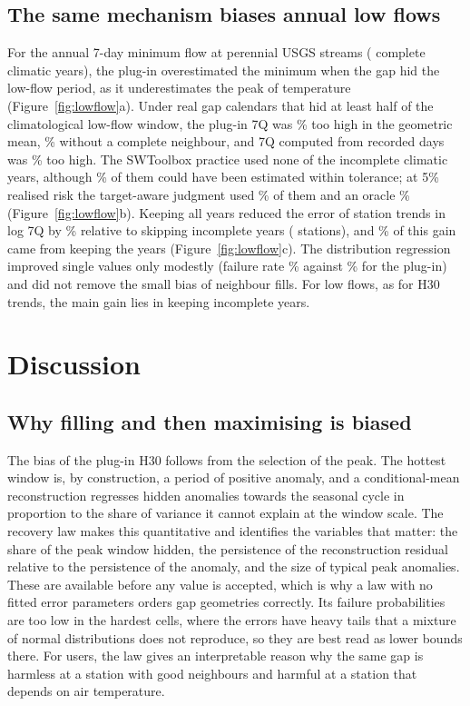 \documentclass[draft]{agujournal2025}
\begin{document}
\subsection{The same mechanism biases annual low flows}
For the annual 7-day minimum flow at \TFlowSites{} perennial USGS streams (\TFlowYears{} complete climatic years), the plug-in overestimated the minimum when the gap hid the low-flow period, as it underestimates the peak of temperature (Figure~\ref{fig:lowflow}a). Under real gap calendars that hid at least half of the climatological low-flow window, the plug-in 7Q was \TFlowBiasHalfPZero\% too high in the geometric mean, \TFlowBiasInterpPZero\% without a complete neighbour, and 7Q computed from recorded days was \TFlowBiasHalfRecorded\% too high. The SWToolbox practice used none of the incomplete climatic years, although \TFlowUsable\% of them could have been estimated within tolerance; at 5\% realised risk the target-aware judgment used \TFlowRetTarget\% of them and an oracle \TFlowRetOracle\% (Figure~\ref{fig:lowflow}b). Keeping all years reduced the error of station trends in log 7Q by \TFlowTrendReduction\% relative to skipping incomplete years (\TFlowTrendStations{} stations), and \TFlowShareKeep\% of this gain came from keeping the years (Figure~\ref{fig:lowflow}c). The distribution regression improved single values only modestly (failure rate \TFlowFailDTwo\% against \TFlowFailPZero\% for the plug-in) and did not remove the small bias of neighbour fills. For low flows, as for H30 trends, the main gain lies in keeping incomplete years.

\section{Discussion}

\subsection{Why filling and then maximising is biased}
The bias of the plug-in H30 follows from the selection of the peak. The hottest window is, by construction, a period of positive anomaly, and a conditional-mean reconstruction regresses hidden anomalies towards the seasonal cycle in proportion to the share of variance it cannot explain at the window scale. The recovery law makes this quantitative and identifies the variables that matter: the share of the peak window hidden, the persistence of the reconstruction residual relative to the persistence of the anomaly, and the size of typical peak anomalies. These are available before any value is accepted, which is why a law with no fitted error parameters orders gap geometries correctly. Its failure probabilities are too low in the hardest cells, where the errors have heavy tails that a mixture of normal distributions does not reproduce, so they are best read as lower bounds there. For users, the law gives an interpretable reason why the same gap is harmless at a station with good neighbours and harmful at a station that depends on air temperature.
\end{document}
